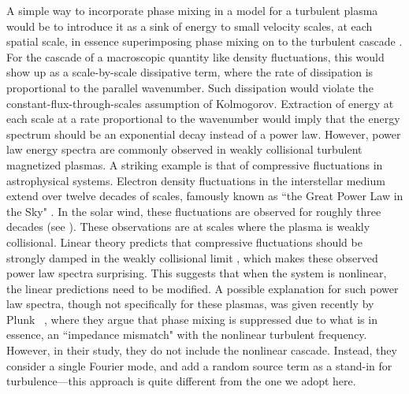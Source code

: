     A simple way to incorporate phase mixing in a model for a turbulent plasma 
    would be to introduce it as
    a sink of energy to small velocity
    scales, at each spatial scale, in essence superimposing phase mixing
    on to the turbulent cascade \cite{quataert98, quataert99, howes08jgr}. For the cascade of a macroscopic quantity like
    density fluctuations, this would show up as a scale-by-scale dissipative term, where the rate of
    dissipation is proportional to the parallel wavenumber. 
    Such dissipation would violate the constant-flux-through-scales assumption of
    Kolmogorov. Extraction of energy at each scale at a rate proportional to
    the wavenumber
    would imply that the energy spectrum 
    should be an exponential decay instead of a power law.
    However, power law energy spectra are commonly observed in weakly collisional turbulent
    magnetized plasmas.
    A striking example is that of compressive
    fluctuations in astrophysical systems. Electron density
    fluctuations in the interstellar medium extend over twelve decades of scales, 
    famously known as ``the Great Power Law in the Sky" \cite{armstrong81, armstrong95,
    lazio04}. In the solar wind, these
    fluctuations are observed for roughly three decades \cite{lovelace70, woo79, celnikier83,
    celnikier87, coles89, marsch90, coles91, bershadskii04, hnat05, kellogg05,
	alexandrova08} (see ). These observations are at scales
    where the plasma is weakly collisional. Linear theory predicts that compressive
    fluctuations should be strongly damped in the weakly collisional limit \cite{barnes66}, which makes
    these observed power law spectra surprising.
    This suggests that when the system is nonlinear, the linear predictions need to be
    modified.
    A possible explanation for such power law spectra, though not specifically for these
    plasmas, was given recently by Plunk \etal\
    \cite{plunk13, plunk14}, where they argue that phase mixing is suppressed due to
    what is in essence, an ``impedance mismatch" with the nonlinear turbulent frequency.
	However, in
    their study, they do not include the nonlinear cascade. Instead, they consider a
    single Fourier mode, and add a random source term as a stand-in for
    turbulence---this approach is quite different from the one we adopt here.

